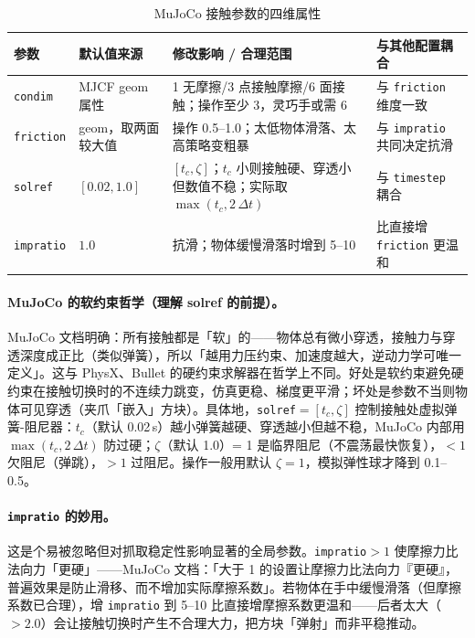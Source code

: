 \begin{table}[ht]
\centering
\small
\caption{MuJoCo 接触参数的四维属性}
\label{tab:rlmc-manip-mjcfcontact}
\begin{tabular}{@{}p{1.9cm}p{2.6cm}p{3.2cm}p{3.0cm}@{}}
\toprule
参数 & 默认值来源 & 修改影响 / 合理范围 & 与其他配置耦合 \\
\midrule
\verb|condim| & MJCF geom 属性 & 1 无摩擦/3 点接触摩擦/6 面接触；操作至少 3，灵巧手或需 6 & 与 \verb|friction| 维度一致 \\
\verb|friction| & geom，取两面较大值 & 操作 0.5--1.0；太低物体滑落、太高策略变粗暴 & 与 \verb|impratio| 共同决定抗滑 \\
\verb|solref| & $[0.02,1.0]$ & $[t_c,\zeta]$；$t_c$ 小则接触硬、穿透小但数值不稳；实际取 $\max(t_c,2\,\Delta t)$ & 与 \verb|timestep| 耦合 \\
\verb|impratio| & $1.0$ & 抗滑；物体缓慢滑落时增到 5--10 & 比直接增 \verb|friction| 更温和 \\
\bottomrule
\end{tabular}
\end{table}

\paragraph{MuJoCo 的软约束哲学（理解 solref 的前提）。}MuJoCo 文档明确：所有接触都是「软」的——物体总有微小穿透，接触力与穿透深度成正比（类似弹簧），所以「越用力压约束、加速度越大，逆动力学可唯一定义」。这与 PhysX、Bullet 的硬约束求解器在哲学上不同。好处是软约束避免硬约束在接触切换时的不连续力跳变，仿真更稳、梯度更平滑；坏处是参数不当则物体可见穿透（夹爪「嵌入」方块）。具体地，\verb|solref|$=[t_c,\zeta]$ 控制接触处虚拟弹簧-阻尼器：$t_c$（默认 0.02\,s）越小弹簧越硬、穿透越小但越不稳，MuJoCo 内部用 $\max(t_c,2\,\Delta t)$ 防过硬；$\zeta$（默认 1.0）= 1 是临界阻尼（不震荡最快恢复），$<1$ 欠阻尼（弹跳），$>1$ 过阻尼。操作一般用默认 $\zeta=1$，模拟弹性球才降到 0.1--0.5。

\paragraph{\texttt{impratio} 的妙用。}这是个易被忽略但对抓取稳定性影响显著的全局参数。\verb|impratio|$>1$ 使摩擦力比法向力「更硬」——MuJoCo 文档：「大于 1 的设置让摩擦力比法向力『更硬』，普遍效果是防止滑移、而不增加实际摩擦系数」。若物体在手中缓慢滑落（但摩擦系数已合理），增 \verb|impratio| 到 5--10 比直接增摩擦系数更温和——后者太大（$>2.0$）会让接触切换时产生不合理大力，把方块「弹射」而非平稳推动。

